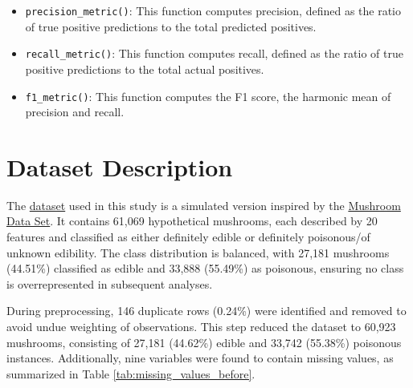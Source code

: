 \documentclass{article}
\begin{document}
\begin{itemize}
    \item \texttt{precision\_metric()}: 
    This function computes precision, defined as the ratio of true positive predictions to the total predicted positives.

    \item \texttt{recall\_metric()}: 
    This function computes recall, defined as the ratio of true positive predictions to the total actual positives.

    \item \texttt{f1\_metric()}: 
    This function computes the F1 score, the harmonic mean of precision and recall.

\end{itemize}

\section{Dataset Description}

The \href{https://archive.ics.uci.edu/dataset/848/secondary+mushroom+dataset}{dataset} used in this study is a simulated version inspired by the \href{https://archive.ics.uci.edu/dataset/73/mushroom}{Mushroom Data Set}. It contains 61,069 hypothetical mushrooms, each described by 20 features and classified as either definitely edible or definitely poisonous/of unknown edibility. The class distribution is balanced, with 27,181 mushrooms (44.51\%) classified as edible and 33,888 (55.49\%) as poisonous, ensuring no class is overrepresented in subsequent analyses.

During preprocessing, 146 duplicate rows (0.24\%) were identified and removed to avoid undue weighting of observations. This step reduced the dataset to 60,923 mushrooms, consisting of 27,181 (44.62\%) edible and 33,742 (55.38\%) poisonous instances. Additionally, nine variables were found to contain missing values, as summarized in Table \ref{tab:missing_values_before}.
\end{document}

